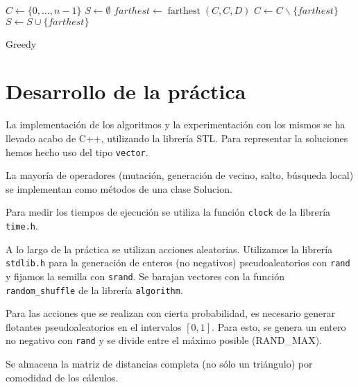\documentclass{article}
\begin{document}
\begin{algorithm}[H]
	\DontPrintSemicolon %
	$C \gets \{0,\ldots, n-1\}$ 
	$S \gets \emptyset$ 
	$farthest \gets \operatorname{farthest}(C,C,D)$ 
	$C \gets C\backslash \{farthest\}$\;
	$S \gets S\cup \{farthest\}$\;
	\;
	\;
	\caption{{\sc Greedy}}
	\label{alg:greedy}
\end{algorithm}

\pagebreak

\section{Desarrollo de la práctica}

La implementación de los algoritmos y la experimentación con los mismos se ha llevado acabo de C++, utilizando la librería STL. 
Para representar la soluciones hemos hecho uso del tipo \texttt{vector}.

La mayoría de operadores (mutación, generación de vecino, salto, búsqueda local) se implementan como métodos de una 
clase Solucion.

Para medir los tiempos de ejecución se utiliza la función \texttt{clock} de la librería \texttt{time.h}.

A lo largo de la práctica se utilizan acciones aleatorias. Utilizamos la librería \texttt{stdlib.h} para la generación de
enteros (no negativos) pseudoaleatorios con \texttt{rand} y fijamos la semilla con \texttt{srand}. Se barajan vectores con la función
 \texttt{random\_shuffle} de la librería \texttt{algorithm}.
 
Para las acciones que se realizan con cierta probabilidad, es necesario generar flotantes pseudoaleatorios en el intervalos $[0,1]$.
Para esto, se genera un entero no negativo con \texttt{rand} y se divide entre el máximo posible (RAND\_MAX).

Se almacena la matriz de distancias completa (no sólo un triángulo) por comodidad de los cálculos.
\end{document}
